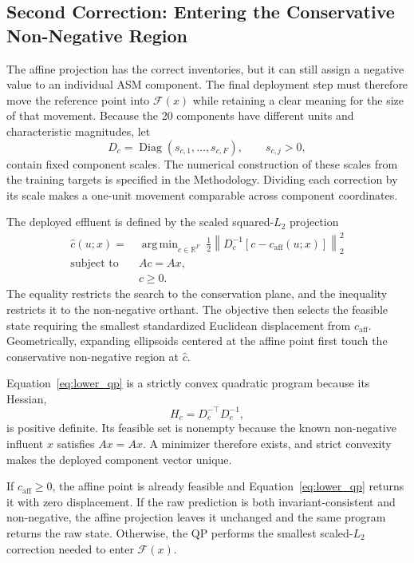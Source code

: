\documentclass[a4paper,fleqn]{cas-sc}
\DeclareMathOperator*{\argminop}{arg\,min}
\newcommand{\R}{\mathbb{R}}
\begin{document}
\subsection{Second Correction: Entering the Conservative Non-Negative Region}

The affine projection has the correct inventories, but it can still assign a negative value to an individual ASM component. The final deployment step must therefore move the reference point into $\mathcal F(x)$ while retaining a clear meaning for the size of that movement. Because the 20 components have different units and characteristic magnitudes, let
\begin{equation*}
D_c=\operatorname{Diag}(s_{c,1},\ldots,s_{c,F}),
\qquad
s_{c,j}>0,
\end{equation*}
contain fixed component scales. The numerical construction of these scales from the training targets is specified in the Methodology. Dividing each correction by its scale makes a one-unit movement comparable across component coordinates.

The deployed effluent is defined by the scaled squared-$L_2$ projection
\begin{equation}
\label{eq:lower_qp}
\begin{aligned}
\widehat c(u;x)={}&
\argminop_{c\in\R^F}\ \frac{1}{2}
\left\|D_c^{-1}[c-c_{\mathrm{aff}}(u;x)]\right\|_2^2\\
\text{subject to}\quad {}&Ac=Ax,\\
&c\geq0.
\end{aligned}
\end{equation}
The equality restricts the search to the conservation plane, and the inequality restricts it to the non-negative orthant. The objective then selects the feasible state requiring the smallest standardized Euclidean displacement from $c_{\mathrm{aff}}$. Geometrically, expanding ellipsoids centered at the affine point first touch the conservative non-negative region at $\widehat c$.

Equation~\eqref{eq:lower_qp} is a strictly convex quadratic program because its Hessian,
\begin{equation}
\label{eq:lower_qp_hessian}
H_c=D_c^{-\top}D_c^{-1},
\end{equation}
is positive definite. Its feasible set is nonempty because the known non-negative influent $x$ satisfies $Ax=Ax$. A minimizer therefore exists, and strict convexity makes the deployed component vector unique.

If $c_{\mathrm{aff}}\geq0$, the affine point is already feasible and Equation~\eqref{eq:lower_qp} returns it with zero displacement. If the raw prediction is both invariant-consistent and non-negative, the affine projection leaves it unchanged and the same program returns the raw state. Otherwise, the QP performs the smallest scaled-$L_2$ correction needed to enter $\mathcal F(x)$.
\end{document}
